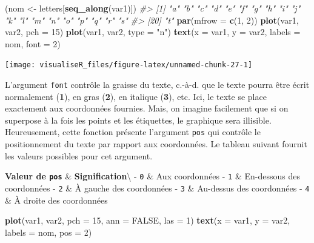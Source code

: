 \documentclass[]{article}
\newenvironment{Shaded}{\begin{snugshade}}{\end{snugshade}}
\newcommand{\CommentTok}[1]{\textcolor[rgb]{0.56,0.35,0.01}{\textit{#1}}}
\newcommand{\DataTypeTok}[1]{\textcolor[rgb]{0.13,0.29,0.53}{#1}}
\newcommand{\DecValTok}[1]{\textcolor[rgb]{0.00,0.00,0.81}{#1}}
\newcommand{\KeywordTok}[1]{\textcolor[rgb]{0.13,0.29,0.53}{\textbf{#1}}}
\newcommand{\NormalTok}[1]{#1}
\newcommand{\OtherTok}[1]{\textcolor[rgb]{0.56,0.35,0.01}{#1}}
\newcommand{\StringTok}[1]{\textcolor[rgb]{0.31,0.60,0.02}{#1}}
\begin{document}
\begin{Shaded}
\begin{Highlighting}[]
\NormalTok{(nom <-}\StringTok{ }\NormalTok{letters[}\KeywordTok{seq_along}\NormalTok{(var1)])}
\CommentTok{#>  [1] "a" "b" "c" "d" "e" "f" "g" "h" "i" "j" "k" "l" "m" "n" "o" "p" "q" "r" "s"}
\CommentTok{#> [20] "t"}
\KeywordTok{par}\NormalTok{(}\DataTypeTok{mfrow =} \KeywordTok{c}\NormalTok{(}\DecValTok{1}\NormalTok{, }\DecValTok{2}\NormalTok{))}
\KeywordTok{plot}\NormalTok{(var1, var2, }\DataTypeTok{pch =} \DecValTok{15}\NormalTok{)}
\KeywordTok{plot}\NormalTok{(var1, var2, }\DataTypeTok{type =} \StringTok{"n"}\NormalTok{)}
\KeywordTok{text}\NormalTok{(}\DataTypeTok{x =}\NormalTok{ var1, }\DataTypeTok{y =}\NormalTok{ var2, }\DataTypeTok{labels =}\NormalTok{ nom, }\DataTypeTok{font =} \DecValTok{2}\NormalTok{)}
\end{Highlighting}
\end{Shaded}

\begin{center}\texttt{[image: visualiseR\_files/figure-latex/unnamed-chunk-27-1]} \end{center}

L'argument \texttt{font} contrôle la graisse du texte, c.-à-d. que le texte pourra être écrit normalement (\textbf{1}), en gras (\textbf{2}), en italique (\textbf{3}), etc. Ici, le texte se place exactement aux coordonnées fournies. Mais, on imagine facilement que si on superpose à la fois les points et les étiquettes, le graphique sera illisible. Heureusement, cette fonction présente l'argument \texttt{pos} qui contrôle le positionnement du texte par rapport aux coordonnées. Le tableau suivant fournit les valeurs possibles pour cet argument.

\textbf{Valeur de \texttt{pos}} \& \textbf{Signification}\textbackslash{}
- \texttt{0} \& Aux coordonnées
- \texttt{1} \& En-dessous des coordonnées
- \texttt{2} \& À gauche des coordonnées
- \texttt{3} \& Au-dessus des coordonnées
- \texttt{4} \& À droite des coordonnées

\begin{Shaded}
\begin{Highlighting}[]
\KeywordTok{plot}\NormalTok{(var1, var2, }\DataTypeTok{pch =} \DecValTok{15}\NormalTok{, }\DataTypeTok{ann =} \OtherTok{FALSE}\NormalTok{, }\DataTypeTok{las =} \DecValTok{1}\NormalTok{)}
\KeywordTok{text}\NormalTok{(}\DataTypeTok{x =}\NormalTok{ var1, }\DataTypeTok{y =}\NormalTok{ var2, }\DataTypeTok{labels =}\NormalTok{ nom, }\DataTypeTok{pos =} \DecValTok{2}\NormalTok{)}
\end{Highlighting}
\end{Shaded}
\end{document}
